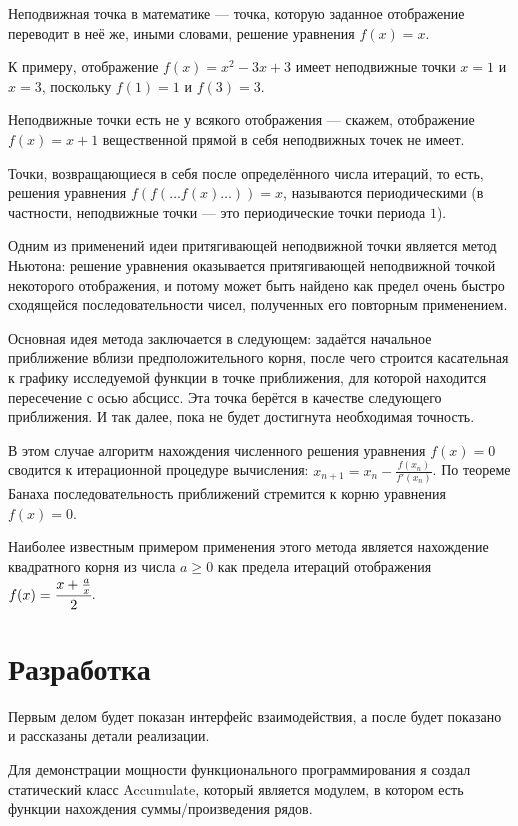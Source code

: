 Неподвижная точка в математике — точка, которую заданное отображение переводит в неё же, иными словами, решение уравнения $f(x)=x$.

К примеру, отображение $f(x)=x^2-3x+3$ имеет неподвижные точки $x=1$ и $x=3$, поскольку $f(1)=1$ и $f(3)=3$.

Неподвижные точки есть не у всякого отображения — скажем, отображение $f(x)=x+1$ вещественной прямой в себя неподвижных точек не имеет.

Точки, возвращающиеся в себя после определённого числа итераций, то есть, решения уравнения $f(f(\dots f(x)\dots))=x$,  называются периодическими (в частности, неподвижные точки — это периодические точки периода $1$).

Одним из применений идеи притягивающей неподвижной точки является метод Ньютона: решение уравнения оказывается притягивающей неподвижной точкой некоторого отображения, и потому может быть найдено как предел очень быстро сходящейся последовательности чисел, полученных его повторным применением.

Основная идея метода заключается в следующем: задаётся начальное приближение вблизи предположительного корня, после чего строится касательная к графику исследуемой функции в точке приближения, для которой находится пересечение с осью абсцисс. Эта точка берётся в качестве следующего приближения. И так далее, пока не будет достигнута необходимая точность.

В этом случае алгоритм нахождения численного решения уравнения $f(x)=0$ сводится к итерационной процедуре вычисления: $x_{n+1}=x_{n}-{\frac {f(x_{n})}{f'(x_{n})}}$. По теореме Банаха последовательность приближений стремится к корню уравнения $f(x)=0$.

Наиболее известным примером применения этого метода является нахождение квадратного корня из числа $a \geq 0$ как предела итераций отображения $f(x)=\cfrac{x+\frac{a}{x}}{2}$.

\newpage
\section{Разработка}

Первым делом будет показан интерфейс взаимодействия, а после будет показано и рассказаны детали реализации.

Для демонстрации мощности функционального программирования я создал статический класс Accumulate, который является модулем, в котором есть функции нахождения суммы/произведения рядов. 

